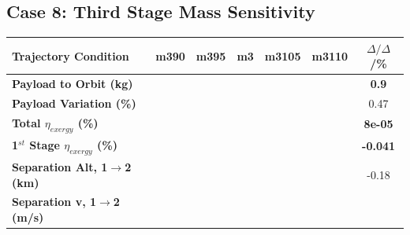 \subsection{Case 8: Third Stage Mass Sensitivity}\label{sec:m3noReturn}

\begin{table}[ht]
	\centering
	
	\begin{tabular}{l c c c c c c} 
		\hline \textbf{Trajectory Condition}
		&m390
		&m395
		&m3
		&m3105
		&m3110
		& $\Delta/\Delta$/\%
		\\
		\hline \textbf{Payload to Orbit (kg)}
		& \textbf{\PayloadToOrbitmThreeNinetyNoReturn}
		& \textbf{\PayloadToOrbitmThreeNinetyFiveNoReturn}
		& \textbf{\PayloadToOrbitmThreeStandardNoReturn}
		& \textbf{\PayloadToOrbitmThreeOneHundredFiveNoReturn}
		& \textbf{\PayloadToOrbitmThreeOneHundredTenNoReturn}
		&\textbf{0.9}
		\\
		\textbf{Payload Variation (\%)}
		& \PayloadVarmThreeNinetyNoReturn
		& \PayloadVarmThreeNinetyFiveNoReturn
		& \PayloadVarmThreeStandardNoReturn
		& \PayloadVarmThreeOneHundredFiveNoReturn
		& \PayloadVarmThreeOneHundredTenNoReturn
		&0.47
		\\
		\textbf{Total $\eta_{exergy}$ (\%)}
		& \textbf{\totalExergyEffmThreeNinetyNoReturn}
		& \textbf{\totalExergyEffmThreeNinetyFiveNoReturn}
		& \textbf{\totalExergyEffmThreeStandardNoReturn}
		& \textbf{\totalExergyEffmThreeOneHundredFiveNoReturn}
		& \textbf{\totalExergyEffmThreeOneHundredTenNoReturn}
		& \textbf{8e-05}
		\\
		\hline 
		\textbf{1$^{st}$ Stage $\eta_{exergy}$ (\%)}
		& \textbf{\firstExergyEffmThreeNinetyNoReturn}
		& \textbf{\firstExergyEffmThreeNinetyFiveNoReturn}
		& \textbf{\firstExergyEffmThreeStandardNoReturn}
		& \textbf{\firstExergyEffmThreeOneHundredFiveNoReturn}
		& \textbf{\firstExergyEffmThreeOneHundredTenNoReturn}
		& \textbf{-0.041}
		\\
		\textbf{Separation Alt, 1$\rightarrow$2 (km)}
		& \firstsecondSeparationAltmThreeNinetyNoReturn
		& \firstsecondSeparationAltmThreeNinetyFiveNoReturn
		& \firstsecondSeparationAltmThreeStandardNoReturn
		& \firstsecondSeparationAltmThreeOneHundredFiveNoReturn
		& \firstsecondSeparationAltmThreeOneHundredTenNoReturn
		&-0.18
		\\
		\textbf{Separation v, 1$\rightarrow$2 (m/s)}
		& \firstsecondSeparationvmThreeNinetyNoReturn
		& \firstsecondSeparationvmThreeNinetyFiveNoReturn
		& \firstsecondSeparationvmThreeStandardNoReturn
		& \firstsecondSeparationvmThreeOneHundredFiveNoReturn

\end{tabular}
\end{table}
